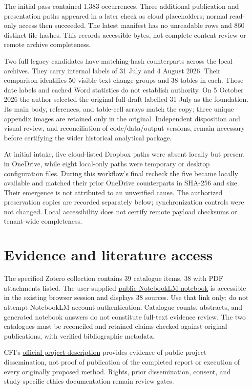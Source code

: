 \documentclass[11pt,a4paper]{article}
\begin{document}
The initial pass contained 1,383 occurrences. Three additional publication and
presentation paths appeared in a later check as cloud placeholders; normal
read-only access then succeeded. The latest manifest has no unreadable rows
and 860 distinct file hashes. This records accessible bytes, not complete
content review or remote archive completeness.

Two full legacy candidates have matching-hash counterparts across the local
archives. They carry internal labels of 31 July and 4 August 2026. Their
comparison identifies 50 visible-text change groups and 38 tables in each.
Those date labels and cached Word statistics do not establish authority. On
5 October 2026 the author selected the original full draft labelled 31 July as
the foundation. Its main body, references, and table-cell arrays match the copy;
three unique appendix images are retained only in the original. Independent
disposition and visual review, and reconciliation of code/data/output versions,
remain necessary before certifying the wider historical analytical package.

At initial intake, five cloud-listed Dropbox paths were absent locally but present in OneDrive, while eight local-only paths were temporary or desktop configuration files. During this workflow's final recheck the five became locally available and matched their prior OneDrive counterparts in SHA-256 and size. Their emergence is not attributed to an unverified cause. The authorized preservation copies are recorded separately below; synchronization controls were not changed. Local accessibility does not certify remote payload checksums or tenant-wide completeness.


\section{Evidence and literature access}
The specified Zotero collection contains 39 catalogue items, 38 with PDF
attachments listed. The user-supplied
\href{https://notebook.google.com/notebook/93a7f63a-ef2b-4c7b-ab8d-d0cfae228189}{public NotebookLM notebook}
is accessible in the existing browser session and displays 38 sources. Use that
link only; do not attempt NotebookLM account authentication. Catalogue counts,
abstracts, and generated notebook answers do not constitute full-text evidence
review. The two catalogues must be reconciled and retained claims checked
against original publications, with verified bibliographic metadata.

CFI's
\href{https://www.centerforfinancialinclusion.org/research/global-dpi-insights-community/}{official project description}
provides evidence of public project dissemination, not proof of publication of
the completed report or execution of every originally proposed method. Rights,
prior dissemination, consent, and study-specific ethics documentation remain
review gates.
\end{document}
